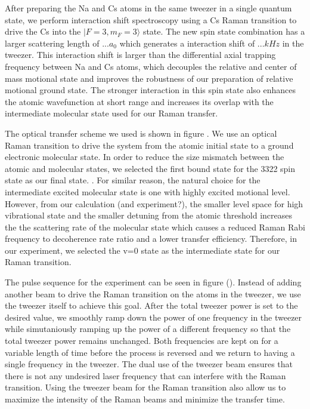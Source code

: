 \documentclass[aps,prl,twocolumn,groupedaddress]{revtex4-1}
\newcommand{\todo}[1]{}
\begin{document}
After preparing the Na and Cs atoms in the same tweezer in a single quantum state, we perform interaction shift spectroscopy using a Cs Raman transition to drive the Cs into the $|F=3,m_F=3\rangle$ state. The new spin state combination has a larger scattering length of $... a_0$ which generates a interaction shift of $... kHz$ in the tweezer. This interaction shift is larger than the differential axial trapping frequency between Na and Cs atoms, which decouples the relative and center of mass motional state and improves the robustness of our preparation of relative motional ground state. The stronger interaction in this spin state also enhances the atomic wavefunction at short range and increases its overlap with the intermediate molecular state used for our Raman transfer.


The optical transfer scheme we used is shown in figure \todo{}.
We use an optical Raman transition to drive the system from the atomic initial state to a
ground electronic molecular state.
In order to reduce the size mismatch between the atomic and molecular states,
we selected the first bound state for the 3322 spin state \todo{asymtopt to the 3322 threshold?} as our final state. \todo{move selection of intermediate state to intro?}.
For similar reason, the natural choice for the intermediate excited molecular state is one
with highly excited motional level.
However, from our calculation (and experiment?), the smaller level space for high
vibrational state and the smaller detuning from the atomic threshold increases the
the scattering rate of the molecular state which causes a reduced Raman Rabi frequency
to decoherence rate ratio and a lower transfer efficiency.
Therefore, in our experiment, we selected the v=0 state as the intermediate state for our
Raman transition.

The pulse sequence for the experiment can be seen in figure (). Instead of adding another beam to drive the Raman transition on the atoms in the tweezer, we use the tweezer itself to achieve this goal. After the total tweezer power is set to the desired value, we smoothly ramp down the power of one frequency in the tweezer while simutaniously ramping up the power of a different frequency so that the total tweezer power remains unchanged. Both frequencies are kept on for a variable length of time before the process is reversed and we return to having a single frequency in the tweezer. The dual use of the tweezer beam ensures that there is not any undesired laser frequency that can interfere with the Raman transition. Using the tweezer beam for the Raman transition also allow us to maximize the intensity of the Raman beams and minimize the transfer time.
\todo{clarify coprop of Raman beam?}
\end{document}
